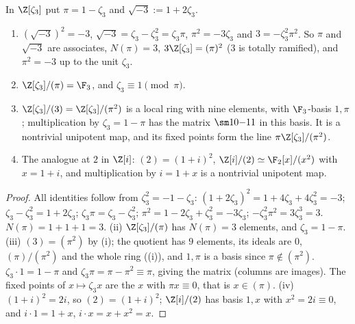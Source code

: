 \begin{proposition}\label{prop:ant:above3}
In $\Z[\zeta_3]$ put $\pi=1-\zeta_3$ and $\sqrt{-3}:=1+2\zeta_3$.
\begin{enumerate}[label=(\roman*)]
\item $(\sqrt{-3})^2=-3$, $\sqrt{-3}=\zeta_3-\zeta_3^2=\zeta_3\pi$, $\pi^2=-3\zeta_3$ and $3=-\zeta_3^2\pi^2$. So $\pi$ and $\sqrt{-3}$ are associates, $N(\pi)=3$,
$3\Z[\zeta_3]=(\pi)^2$ ($3$ is totally ramified), and $\pi^2=-3$ up to the unit $\zeta_3$.
\item $\Z[\zeta_3]/(\pi)=\F_3$, and $\zeta_3\equiv1\pmod\pi$.
\item $\Z[\zeta_3]/(3)=\Z[\zeta_3]/(\pi^2)$ is a local ring with nine elements, with $\F_3$-basis $1,\pi$; multiplication by $\zeta_3=1-\pi$ has the matrix
$\sm10{-1}1$ in this basis. It is a nontrivial unipotent map, and its fixed points form the line $\pi\Z[\zeta_3]/(\pi^2)$.
\item The analogue at $2$ in $\Z[i]$: $(2)=(1+i)^2$, $\Z[i]/(2)\simeq\F_2[x]/(x^2)$ with $x=1+i$, and multiplication by $i=1+x$ is a nontrivial unipotent map.
\end{enumerate}
\end{proposition}

\begin{proof}
All identities follow from $\zeta_3^2=-1-\zeta_3$: $(1+2\zeta_3)^2=1+4\zeta_3+4\zeta_3^2=-3$; $\zeta_3-\zeta_3^2=1+2\zeta_3$; $\zeta_3\pi=\zeta_3-\zeta_3^2$;
$\pi^2=1-2\zeta_3+\zeta_3^2=-3\zeta_3$; $-\zeta_3^2\pi^2=3\zeta_3^3=3$. $N(\pi)=1+1+1=3$. (ii) $\Z[\zeta_3]/(\pi)$ has $N(\pi)=3$ elements, and
$\zeta_3=1-\pi$. (iii) $(3)=(\pi^2)$ by (i); the quotient has $9$ elements, its ideals are $0$, $(\pi)/(\pi^2)$ and the whole ring
((i)), and $1,\pi$ is a basis since $\pi\notin(\pi^2)$. $\zeta_3\cdot1=1-\pi$ and $\zeta_3\pi=\pi-\pi^2\equiv\pi$, giving the matrix (columns are
images). The fixed points of $x\mapsto\zeta_3x$ are the $x$ with $\pi x\equiv0$, that is $x\in(\pi)$. (iv) $(1+i)^2=2i$, so $(2)=(1+i)^2$; $\Z[i]/(2)$ has basis
$1,x$ with $x^2=2i\equiv0$, and $i\cdot1=1+x$, $i\cdot x=x+x^2=x$.
\end{proof}

